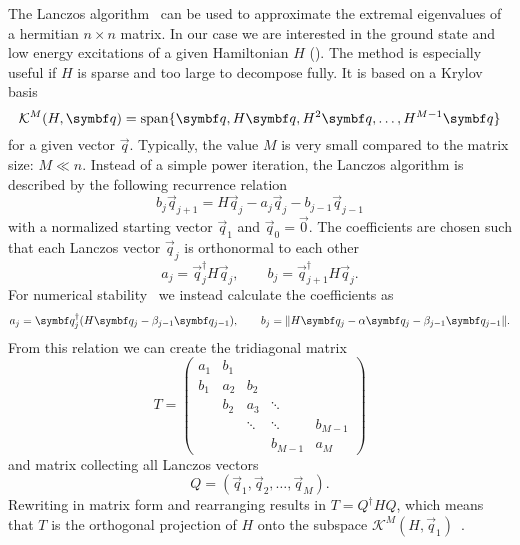 The Lanczos algorithm~\cite{Lanczos1950} can be used to approximate the extremal eigenvalues
of a hermitian $n\times n$ matrix.
In our case we are interested in the ground state and low energy excitations of a
given Hamiltonian $H$ ().
The method is especially useful if $H$ is sparse and too large to decompose fully.
It is based on a Krylov basis
\begin{equation}
    \mathcal{K}^M(H, \vec{q}) = \spn\{\vec{q}, H\vec{q}, H^2\vec{q}, \ldots, H^{M-1}\vec{q}\}
\end{equation}
for a given vector $\vec{q}$.
Typically, the value $M$ is very small compared to the matrix size: $M \ll n$.
Instead of a simple power iteration, the Lanczos algorithm is described by the
following recurrence relation
\begin{equation}
    b_j\vec{q}_{j+1} = H\vec{q}_j - a_j\vec{q}_j - b_{j-1}\vec{q}_{j-1}
    \label{eq:Lanczos-recurrence}
\end{equation}
with a normalized starting vector $\vec{q}_1$ and $\vec{q}_0 = \vec{0}$.
The coefficients are chosen such that each Lanczos vector $\vec{q}_j$ is orthonormal to each other
\begin{equation}
    a_j = \vec{q}_j^\dag H \vec{q}_j,
    \qquad
    b_j = \vec{q}_{j+1}^\dag H \vec{q}_j.
\end{equation}
For numerical stability~\cite{Paige1972, Paige1976}
we instead calculate the coefficients as
\begin{equation}
    a_j = \vec{q}_j^\dag(H \vec{q}_j - \beta_{j-1}\vec{q}_{j-1}),
    \qquad
    b_j = \norm{H\vec{q}_j - \alpha\vec{q}_j -  \beta_{j-1}\vec{q}_{j-1}}.
\end{equation}
From this relation we can create the tridiagonal matrix
\begin{equation}
    T
    =
    \begin{pmatrix}
        a_1 & b_1 &        &         &         \\
        b_1 & a_2 & b_2    &         &         \\
            & b_2 & a_3    & \ddots  &         \\
            &     & \ddots & \ddots  & b_{M-1} \\
            &     &        & b_{M-1} & a_M
    \end{pmatrix}
    \label{eq:tridiagonal-scalar}
\end{equation}
and matrix collecting all Lanczos vectors
\begin{equation}
    Q = (\vec{q}_1, \vec{q}_2, \ldots, \vec{q}_M).
\end{equation}
Rewriting  in matrix form and rearranging results in $T = Q^\dag H Q$,
which means that $T$ is the orthogonal projection of $H$ onto
the subspace $\mathcal{K}^M(H, \vec{q}_1)$~\cite{Cullum1985}.

